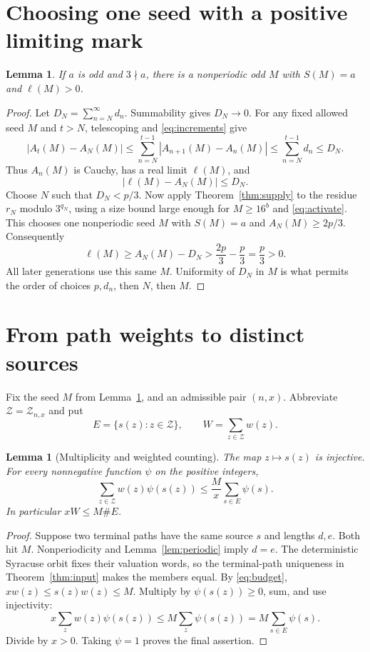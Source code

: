 \documentclass[11pt]{article}
\newtheorem{lemma}[theorem]{Lemma}
\begin{document}
\section{Choosing one seed with a positive limiting mark}
\begin{lemma}\label{lem:limit}
If $a$ is odd and $3\nmid a$, there is a nonperiodic odd $M$ with
$S(M)=a$ and $\ell(M)>0$.
\end{lemma}
\begin{proof}
Let $D_N=\sum_{n=N}^{\infty}d_n$. Summability gives $D_N\to0$.
For any fixed allowed seed $M$ and $t>N$, telescoping and
\eqref{eq:increments} give
\[
 |A_t(M)-A_N(M)|
 \le\sum_{n=N}^{t-1}|A_{n+1}(M)-A_n(M)|
 \le\sum_{n=N}^{t-1}d_n\le D_N.
\]
Thus $A_n(M)$ is Cauchy, has a real limit $\ell(M)$, and
\begin{equation}\label{eq:tail}
 |\ell(M)-A_N(M)|\le D_N.
\end{equation}
Choose $N$ such that $D_N<p/3$. Now apply
Theorem~\ref{thm:supply} to the residue $r_N$ modulo $3^{q_N}$, using
a size bound large enough for $M\ge16^b$ and \eqref{eq:activate}.
This chooses one nonperiodic seed $M$ with $S(M)=a$ and
$A_N(M)\ge2p/3$. Consequently
\[
 \ell(M)\ge A_N(M)-D_N>\frac{2p}{3}-\frac p3=\frac p3>0.
\]
All later generations use this same $M$. Uniformity of $D_N$ in $M$
is what permits the order of choices $p,d_n$, then $N$, then $M$.
\end{proof}

\section{From path weights to distinct sources}
Fix the seed $M$ from Lemma~\ref{lem:limit}, and an admissible pair $(n,x)$.
Abbreviate $\mathcal Z=\mathcal Z_{n,x}$ and put
\[
 E=\{s(z):z\in\mathcal Z\},\qquad W=\sum_{z\in\mathcal Z}w(z).
\]
\begin{lemma}[Multiplicity and weighted counting]\label{lem:charge}
The map $z\mapsto s(z)$ is injective. For every nonnegative function
$\psi$ on the positive integers,
\begin{equation}\label{eq:charge}
 \sum_{z\in\mathcal Z}w(z)\psi(s(z))
 \le\frac Mx\sum_{s\in E}\psi(s).
\end{equation}
In particular $xW\le M\#E$.
\end{lemma}
\begin{proof}
Suppose two terminal paths have the same source $s$ and lengths $d,e$.
Both hit $M$. Nonperiodicity and Lemma~\ref{lem:periodic} imply $d=e$.
The deterministic Syracuse orbit fixes their valuation words, so the
terminal-path uniqueness in Theorem~\ref{thm:input} makes the members equal.
By \eqref{eq:budget}, $xw(z)\le s(z)w(z)\le M$. Multiply by
$\psi(s(z))\ge0$, sum, and use injectivity:
\[
 x\sum_z w(z)\psi(s(z))\le M\sum_z\psi(s(z))
 =M\sum_{s\in E}\psi(s).
\]
Divide by $x>0$. Taking $\psi=1$ proves the final assertion.
\end{proof}
\end{document}
